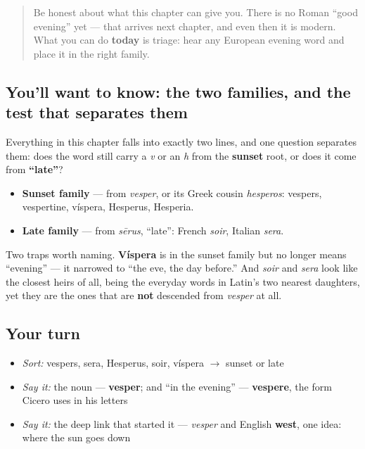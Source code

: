 \label{lesson:LA-C33-practice}



\begin{quote}
Be honest about what this chapter can give you. There is no Roman \textquotedblleft{}good evening\textquotedblright{} yet — that arrives next chapter, and even then it is modern. What you can do \textbf{today} is triage: hear any European evening word and place it in the right family.
\end{quote}

\subsection*{You'll want to know: the two families, and the test that separates them}
Everything in this chapter falls into exactly two lines, and one question separates them: does the word still carry a \emph{v} or an \emph{h} from the \textbf{sunset} root, or does it come from \textbf{\textquotedblleft{}late\textquotedblright{}}?

\begin{itemize}
\raggedright
  \item \textbf{Sunset family} — from \emph{vesper}, or its Greek cousin \emph{hesperos}: vespers, vespertine, víspera, Hesperus, Hesperia.
  \item \textbf{Late family} — from \emph{sērus}, \textquotedblleft{}late\textquotedblright{}: French \emph{soir}, Italian \emph{sera}.
\end{itemize}

Two traps worth naming. \textbf{Víspera} is in the sunset family but no longer means \textquotedblleft{}evening\textquotedblright{} — it narrowed to \textquotedblleft{}the eve, the day before.\textquotedblright{} And \emph{soir} and \emph{sera} look like the closest heirs of all, being the everyday words in Latin's two nearest daughters, yet they are the ones that are \textbf{not} descended from \emph{vesper} at all.

\subsection*{Your turn}
\begin{itemize}
\raggedright
  \item \emph{Sort:} vespers, sera, Hesperus, soir, víspera $\to$ sunset or late
  \item \emph{Say it:} the noun — \textbf{vesper}; and \textquotedblleft{}in the evening\textquotedblright{} — \textbf{vespere}, the form Cicero uses in his letters
  \item \emph{Say it:} the deep link that started it — \emph{vesper} and English \textbf{west}, one idea: where the sun goes down
\end{itemize}


